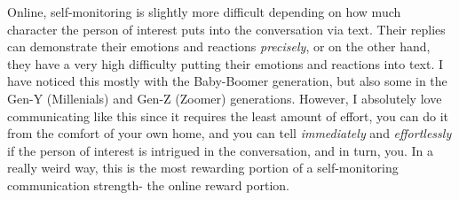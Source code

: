 \documentclass[12pt]{article}
\begin{document}
\par
Online, self-monitoring is slightly more difficult depending on how much character the person of interest puts into the conversation via text. Their replies can demonstrate their emotions and reactions \emph{precisely}, or on the other hand, they have a very high difficulty putting their emotions and reactions into text. I have noticed this mostly with the Baby-Boomer generation, but also some in the Gen-Y (Millenials) and Gen-Z (Zoomer) generations. However, I absolutely love communicating like this since it requires the least amount of effort, you can do it from the comfort of your own home, and you can tell \emph{immediately} and \emph{effortlessly} if the person of interest is intrigued in the conversation, and in turn, you. In a really weird way, this is the most rewarding portion of a self-monitoring communication strength- the online reward portion.
\end{document}

